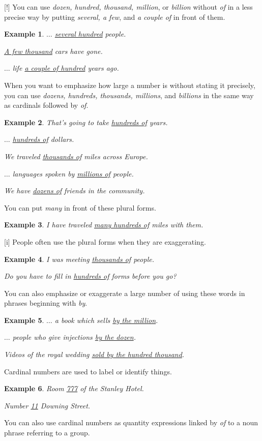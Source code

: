 \documentclass[oneside]{book}
\numberwithin{equation}{section}
\newtheorem{example}{Example}[section]
\begin{document}
%
\noindent{} [!] You can use \textit{dozen, hundred, thousand, million}, or \textit{billion} without \textit{of} in a less precise way by putting \textit{several, a few}, and \textit{a couple of} in front of them.
\begin{example}
    $\ldots$ \underline{several hundred} people.
    
    \underline{A few thousand} cars have gone.
    
    $\ldots$ life \underline{a couple of hundred} years ago.
\end{example}
%
\noindent{} When you want to emphasize how large a number is without stating it precisely, you can use \textit{dozens, hundreds, thousands, millions}, and \textit{billions} in the same way as cardinals followed by \textit{of}.
\begin{example}
    That's going to take \underline{hundreds of} years.
    
    $\ldots$ \underline{hundreds of} dollars.
    
    We traveled \underline{thousands of} miles across Europe.
    
    $\ldots$ languages spoken by \underline{millions of} people.
    
    We have \underline{dozens of} friends in the community.
\end{example}
You can put \textit{many} in front of these plural forms.
\begin{example}
    I have traveled \underline{many hundreds of} miles with them.
\end{example}
%
\noindent{} [i] People often use the plural forms when they are exaggerating.
\begin{example}
    I was meeting \underline{thousands of} people.
    
    Do you have to fill in \underline{hundreds of} forms before you go?
\end{example}
You can also emphasize or exaggerate a large number of using these words in phrases beginning with \textit{by}.
\begin{example}
    $\ldots$ a book which sells \underline{by the million}.
    
    $\ldots$ people who give injections \underline{by the dozen}.
    
    Videos of the royal wedding \underline{sold by the hundred thousand}.
\end{example}
%
\noindent{} Cardinal numbers are used to label or identify things.
\begin{example}
    Room \underline{777} of the Stanley Hotel.
    
    Number \underline{11} Downing Street.
\end{example}
%
\noindent{} You can also use cardinal numbers as quantity expressions linked by \textit{of} to a noun phrase referring to a group.
\end{document}
